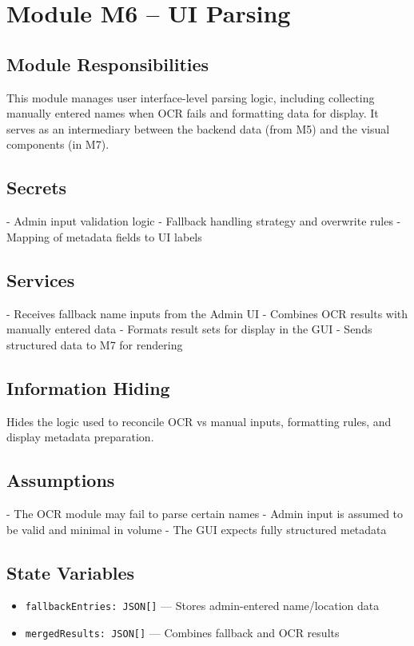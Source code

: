 \documentclass[12pt, titlepage]{article}
\begin{document}

\section{Module M6 – UI Parsing}
\label{SecM6}

\subsection*{Module Responsibilities}
This module manages user interface-level parsing logic, including collecting manually entered names when OCR fails and formatting data for display. It serves as an intermediary between the backend data (from M5) and the visual components (in M7).

\subsection*{Secrets}
- Admin input validation logic  
- Fallback handling strategy and overwrite rules  
- Mapping of metadata fields to UI labels

\subsection*{Services}
- Receives fallback name inputs from the Admin UI  
- Combines OCR results with manually entered data  
- Formats result sets for display in the GUI  
- Sends structured data to M7 for rendering

\subsection*{Information Hiding}
Hides the logic used to reconcile OCR vs manual inputs, formatting rules, and display metadata preparation.

\subsection*{Assumptions}
- The OCR module may fail to parse certain names  
- Admin input is assumed to be valid and minimal in volume  
- The GUI expects fully structured metadata

\subsection*{State Variables}
\begin{itemize}
  \item \texttt{fallbackEntries: JSON[]} — Stores admin-entered name/location data  
  \item \texttt{mergedResults: JSON[]} — Combines fallback and OCR results
\end{itemize}
\end{document}
